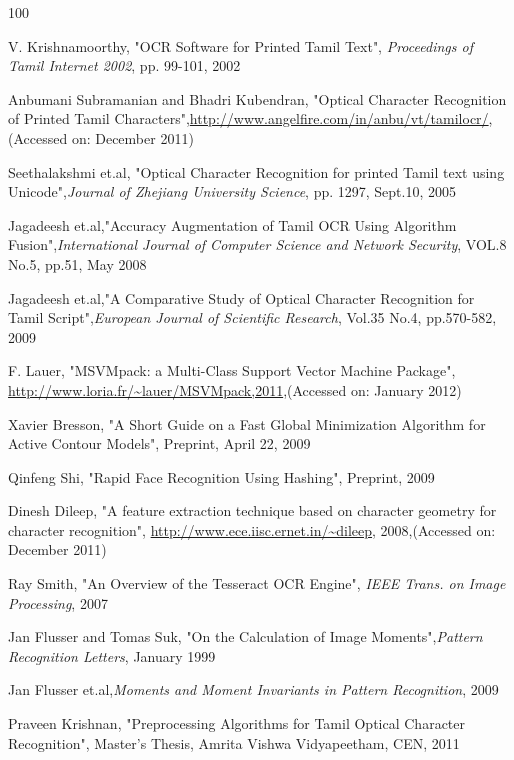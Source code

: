 \begin{thereferences}{100}

V. Krishnamoorthy, "OCR Software for Printed Tamil Text", 
\emph{Proceedings of Tamil Internet 2002}, pp. 99-101, 2002

Anbumani Subramanian and Bhadri Kubendran, "Optical Character Recognition of Printed Tamil Characters",\url{http://www.angelfire.com/in/anbu/vt/tamilocr/},(Accessed on: December 2011)

Seethalakshmi et.al, "Optical Character Recognition for printed Tamil text using Unicode",\emph{Journal of Zhejiang University Science}, pp. 1297, Sept.10, 2005

Jagadeesh et.al,"Accuracy Augmentation of Tamil OCR Using Algorithm Fusion",\emph{International Journal of Computer Science and Network Security}, VOL.8 No.5, pp.51, May 2008

Jagadeesh et.al,"A Comparative Study of Optical Character Recognition for Tamil Script",\emph{European Journal of Scientific Research}, Vol.35 No.4, pp.570-582, 2009


F. Lauer, "MSVMpack: a Multi-Class Support Vector Machine Package",
\url{http://www.loria.fr/~lauer/MSVMpack,2011},(Accessed on: January 2012)
   
  Xavier Bresson, "A Short Guide on a Fast Global Minimization Algorithm for Active Contour Models", Preprint, April 22, 2009

Qinfeng Shi, "Rapid Face Recognition Using Hashing", Preprint, 2009
      
Dinesh Dileep, "A feature extraction technique based on character geometry for character recognition",
\url{http://www.ece.iisc.ernet.in/~dileep}, 2008,(Accessed on: December 2011)

Ray Smith, "An Overview of the Tesseract OCR Engine", \emph{IEEE Trans. on Image Processing}, 2007

Jan Flusser and Tomas Suk, "On the Calculation of Image Moments",\emph{Pattern Recognition Letters}, 
January 1999


Jan Flusser et.al,\emph{Moments and Moment Invariants in Pattern Recognition}, 2009

Praveen Krishnan, "Preprocessing Algorithms for Tamil
Optical Character Recognition", Master's Thesis, Amrita Vishwa Vidyapeetham, CEN, 2011


\end{thereferences}

